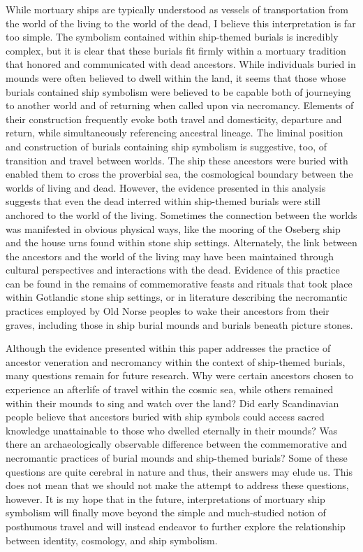 While mortuary ships are typically understood as vessels of transportation from the world of the living to the world of the dead, I believe this interpretation is far too simple. The symbolism contained within ship-themed burials is incredibly complex, but it is clear that these burials fit firmly within a mortuary tradition that honored and communicated with dead ancestors. While individuals buried in mounds were often believed to dwell within the land, it seems that those whose burials contained ship symbolism were believed to be capable both of journeying to another world and of returning when called upon via necromancy. Elements of their construction frequently evoke both travel and domesticity, departure and return, while simultaneously referencing ancestral lineage. The liminal position and construction of burials containing ship symbolism is suggestive, too, of transition and travel between worlds. The ship these ancestors were buried with enabled them to cross the proverbial sea, the cosmological boundary between the worlds of living and dead. However, the evidence presented in this analysis suggests that even the dead interred within ship-themed burials were still anchored to the world of the living. Sometimes the connection between the worlds was manifested in obvious physical ways, like the mooring of the Oseberg ship and the house urns found within stone ship settings. Alternately, the link between the ancestors and the world of the living may have been maintained through cultural perspectives and interactions with the dead. Evidence of this practice can be found in the remains of commemorative feasts and rituals that took place within Gotlandic stone ship settings, or in literature describing the necromantic practices employed by Old Norse peoples to wake their ancestors from their graves, including those in ship burial mounds and burials beneath picture stones.

Although the evidence presented within this paper addresses the practice of ancestor veneration and necromancy within the context of ship-themed burials, many questions remain for future research. Why were certain ancestors chosen to experience an afterlife of travel within the cosmic sea, while others remained within their mounds to sing and watch over the land? Did early Scandinavian people believe that ancestors buried with ship symbols could access sacred knowledge unattainable to those who dwelled eternally in their mounds? Was there an archaeologically observable difference between the commemorative and necromantic practices of burial mounds and ship-themed burials? Some of these questions are quite cerebral in nature and thus, their answers may elude us. This does not mean that we should not make the attempt to address these questions, however. It is my hope that in the future, interpretations of mortuary ship symbolism will finally move beyond the simple and much-studied notion of posthumous travel and will instead endeavor to further explore the relationship between identity, cosmology, and ship symbolism.


\IJSRAseparator


\IJSRAclosing%
